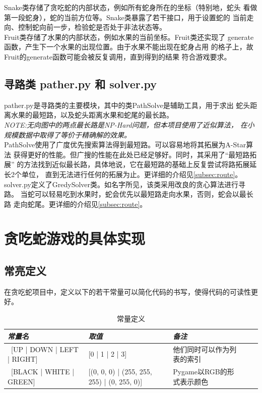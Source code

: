 \documentclass[a4paper]{article}
\begin{document}
Snake类存储了贪吃蛇的内部状态，例如所有蛇身所在的坐标（特别地，蛇头
看做第一段蛇身），蛇的当前方位等。Snake类暴露了若干接口，用于设置蛇的
当前走向、控制蛇向前一步，检验蛇是否处于非法状态等。\\

Fruit类存储了水果的内部状态，例如水果的当前坐标。Fruit类还实现了
generate函数，产生下一个水果的出现位置。由于水果不能出现在蛇身占用
的格子上，故Fruit的generate函数可能会被反复调用，直到得到的结果
符合游戏要求。

\subsection{寻路类 pather.py 和 solver.py}
pather.py是寻路类的主要模块，其中的类PathSolve是辅助工具，用于求出
蛇头距离水果的最短路，以及蛇头距离水果和蛇尾的最长路。\\

\emph{NOTE:无向图中的两点最长路是NP-Hard问题，但本项目使用了近似算法，
在小规模数据中取得了等价于精确解的效果。} \\

PathSolve使用了广度优先搜索算法得到最短路。可以容易地将其拓展为A-Star算法
获得更好的性能。但广搜的性能在此处已经足够好。同时，其采用了``最短路拓展''
的方法找到近似最长路，具体地说，它在最短路的基础上反复尝试将路拓展延长2个单位，
直到无法进行任何的拓展为止。更详细的介绍见\autoref{subsec:route}。\\

solver.py定义了GredySolver类。如名字所见，该类采用改良的贪心算法进行寻路。
当蛇可以轻易吃到水果时，蛇会优先以最短路走向水果，否则，蛇会以最长路
走向蛇尾。更详细的介绍见\autoref{subsec:route}。

\section{贪吃蛇游戏的具体实现}
\subsection{常亮定义}
在贪吃蛇项目中，定义以下的若干常量可以简化代码的书写，使得代码的可读性更好。
\begin{table}[!htb]
\caption{常量定义}\label{tab:const}
\begin{tabular}{@{} *5l @{}}
    \toprule
    \emph{常量名} & \emph{取值} &\emph{备注}&& \\
    \midrule
    \ [UP | DOWN | LEFT | RIGHT]  & [0 | 1 | 2 | 3] & 他们同时可以作为列表的索引 \\
    \ [BLACK | WHITE | GREEN] & [(0, 0, 0) | (255, 255, 255) | (0, 255, 0)] & Pygame以RGB的形式表示颜色 \\
    \bottomrule
\hline
\end{tabular}
\end{table}
\end{document}
